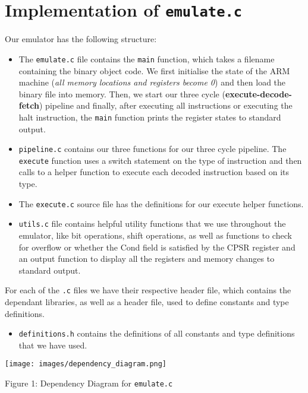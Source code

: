 \documentclass[11pt]{article}
\begin{document}
\section{Implementation of \texttt{emulate.c}}

Our emulator has the following structure:
\begin{itemize}
    
\item The \texttt{emulate.c} file contains the \texttt{main} function, which takes a filename containing the binary object code. We first initialise the state of the ARM machine (\textit{all memory locations and registers become 0}) and then load the binary file into memory. Then, we start our three cycle (\textbf{execute-decode-fetch}) pipeline and finally, after executing all instructions or executing the halt instruction, the \texttt{main} function prints the register states to standard output.
\end{itemize}
\begin{minipage}{0.6\linewidth}
\begin{itemize}
\item \texttt{pipeline.c} contains our three functions for our three cycle pipeline. The \texttt{execute} function uses a switch statement on the type of instruction and then calls to a helper function to execute each decoded instruction based on its type.
\item The \texttt{execute.c} source file has the definitions for our execute helper functions.
\item \texttt{utils.c} file contains helpful utility functions that we use throughout the emulator, like bit operations, shift operations, as well as functions to check for overflow or whether the Cond field is satisfied by the CPSR register and an output function to display all the registers and memory changes to standard output.
\end{itemize}

\par For each of the \texttt{.c} files we have their respective header file, which contains the dependant libraries, as well as a header file, used to define constants and type definitions.
\begin{itemize}
    \item \texttt{definitions.h} contains the definitions of all constants and type definitions that we have used.
\end{itemize}
\end{minipage}
\hspace{0.05\linewidth}
\begin{minipage}{0.35\linewidth}

\centering
\texttt{[image: images/dependency\_diagram.png]}
\caption{Figure 1: Dependency Diagram for \texttt{emulate.c}}
\end{minipage}
\end{document}
